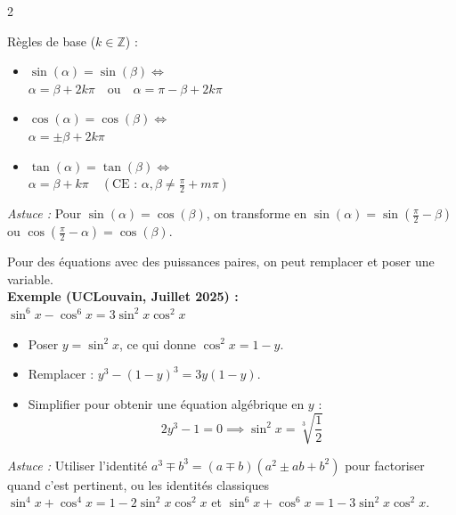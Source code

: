 {\fontsize{9.5pt}{11.5pt}\selectfont
\setlength{\columnsep}{18pt}
\begin{multicols}{2}


\vspace{2pt}
\noindent Règles de base ($k \in \mathbb{Z}$) :
\begin{itemize}[leftmargin=1.2em, itemsep=2pt, topsep=2pt]
    \item $\sin(\alpha) = \sin(\beta) \iff$\\
    $\alpha = \beta + 2k\pi \quad\text{ou}\quad \alpha = \pi - \beta + 2k\pi$
    \item $\cos(\alpha) = \cos(\beta) \iff$\\
    $\alpha = \pm\beta + 2k\pi$
    \item $\tan(\alpha) = \tan(\beta) \iff$\\
    $\alpha = \beta + k\pi \quad \left(\text{CE : } \alpha,\beta \neq \frac{\pi}{2}+m\pi\right)$
\end{itemize}
\textit{Astuce :} Pour $\sin(\alpha) = \cos(\beta)$, on transforme en $\sin(\alpha) = \sin\left(\frac{\pi}{2} - \beta\right)$ ou $\cos\left(\frac{\pi}{2} - \alpha\right) = \cos(\beta)$.

\vspace{6pt}

\vspace{2pt}
\noindent Pour des équations avec des puissances paires, on peut remplacer et poser une variable.\\
\textbf{Exemple (UCLouvain, Juillet 2025) :}\\
$\sin^6 x - \cos^6 x = 3\sin^2 x \cos^2 x$
\begin{itemize}[leftmargin=1.2em, itemsep=2pt, topsep=2pt]
    \item Poser $y = \sin^2 x$, ce qui donne $\cos^2 x = 1 - y$.
    \item Remplacer : $y^3 - (1-y)^3 = 3y(1-y)$.
    \item Simplifier pour obtenir une équation algébrique en $y$ :
    \[
        2y^3 - 1 = 0 \implies \sin^2 x = \sqrt[3]{\frac{1}{2}}
    \]
\end{itemize}
\textit{Astuce :} Utiliser l'identité $a^3 \mp b^3 = (a\mp b)(a^2 \pm ab + b^2)$ pour factoriser quand c'est pertinent, ou les identités classiques $\sin^4 x + \cos^4 x = 1 - 2\sin^2 x\cos^2 x$ et $\sin^6 x + \cos^6 x = 1 - 3\sin^2 x\cos^2 x$.


\end{multicols}}
